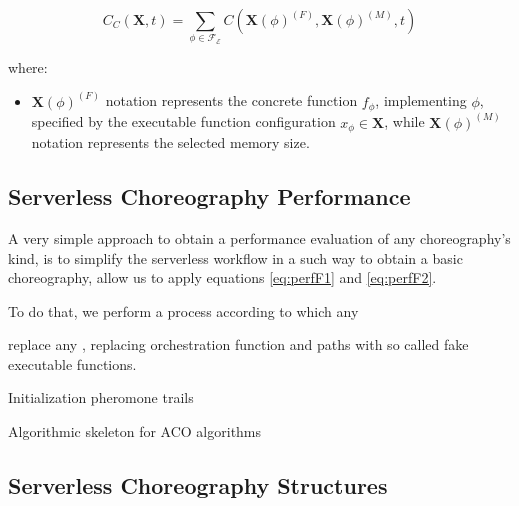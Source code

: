 \documentclass[12pt,a4paper]{report}
\begin{document}
\begin{equation}\label{eq:perfF2}
	C_C(\textbf{X}, t) = \sum_{\phi \in \mathscr{F_E}} C(\textbf{X}(\phi)^{(F)},\textbf{X}(\phi)^{(M)},t)
\end{equation}

where:

\begin{itemize}
	\item $\textbf{X}(\phi)^{(F)}$ notation represents the concrete function $f_{\phi}$, implementing $\phi$, specified by the executable function configuration $x_{\phi} \in \textbf{X}$, while $\textbf{X}(\phi)^{(M)}$ notation represents the selected memory size.
\end{itemize}

\subsection{Serverless Choreography Performance}

A very simple approach to obtain a performance evaluation of any choreography's kind, is to simplify the serverless workflow in a such way to obtain a basic choreography, allow us to apply equations \ref{eq:perfF1} and \ref{eq:perfF2}.

To do that, we perform a process according to which any 


replace any 
, replacing orchestration function and paths with so called fake executable functions.

\begin{algorithm}
	
		
	
	
	Initialization pheromone trails\;
	\caption{Algorithmic skeleton for ACO algorithms}
\end{algorithm}


\subsection{Serverless Choreography Structures}
\end{document}
